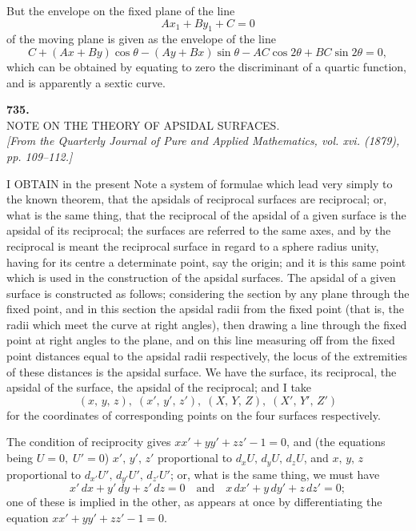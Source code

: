 \documentclass[11pt]{article}
\begin{document}
\bigskip

But the envelope on the fixed plane of the line
\[
   Ax_1 + By_1 + C = 0
\]
of the moving plane is given as the envelope of the line
\[
   C + (Ax + By)\cos\theta - (Ay + Bx)\sin\theta - AC\cos 2\theta + BC\sin 2\theta = 0,
\]
which can be obtained by equating to zero the discriminant of a quartic function,
and is apparently a sextic curve.

\bigskip

\begin{center}
\textbf{735.}\\[6pt]
\textsc{NOTE ON THE THEORY OF APSIDAL SURFACES.}\\[6pt]
\textit{[From the Quarterly Journal of Pure and Applied Mathematics, vol. xvi. (1879),\\
pp. 109--112.]}
\end{center}

\bigskip

I OBTAIN in the present Note a system of formulae which lead very simply to
the known theorem, that the apsidals of reciprocal surfaces are reciprocal; or, what is
the same thing, that the reciprocal of the apsidal of a given surface is the apsidal
of its reciprocal; the surfaces are referred to the same axes, and by the reciprocal is
meant the reciprocal surface in regard to a sphere radius unity, having for its centre
a determinate point, say the origin; and it is this same point which is used in the
construction of the apsidal surfaces. The apsidal of a given surface is constructed as
follows; considering the section by any plane through the fixed point, and in this
section the apsidal radii from the fixed point (that is, the radii which meet the curve
at right angles), then drawing a line through the fixed point at right angles to the
plane, and on this line measuring off from the fixed point distances equal to the
apsidal radii respectively, the locus of the extremities of these distances is the apsidal
surface. We have the surface, its reciprocal, the apsidal of the surface, the apsidal of
the reciprocal; and I take
\[
   (x,\,y,\,z),\;(x',\,y',\,z'),\;(X,\,Y,\,Z),\;(X',\,Y',\,Z')
\]
for the coordinates of corresponding points on the four surfaces respectively.

The condition of reciprocity gives $xx' + yy' + zz' - 1 = 0$, and (the equations being
$U = 0,\; U' = 0$) $x',\,y',\,z'$ proportional to $d_x U,\,d_y U,\,d_z U$, and $x,\,y,\,z$ proportional to
$d_{x'} U',\,d_{y'} U',\,d_{z'} U'$; or, what is the same thing, we must have
\[
   x'\,dx + y'\,dy + z'\,dz = 0\quad\text{and}\quad x\,dx' + y\,dy' + z\,dz' = 0;
\]
one of these is implied in the other, as appears at once by differentiating the equation
$xx' + yy' + zz' - 1 = 0$.
\end{document}
